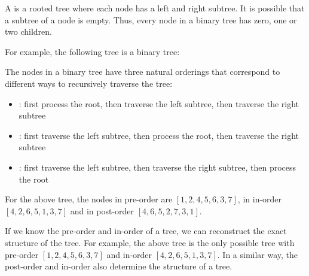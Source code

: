 
\begin{samepage}
A  is a rooted tree
where each node has a left and right subtree.
It is possible that a subtree of a node is empty.
Thus, every node in a binary tree has
zero, one or two children.

For example, the following tree is a binary tree:
\begin{center}
\end{center}
\end{samepage}


The nodes in a binary tree have three natural
orderings that correspond to different ways to 
recursively traverse the tree:

\begin{itemize}
\item {}: first process the root,
then traverse the left subtree, then traverse the right subtree
\item {}: first traverse the left subtree,
then process the root, then traverse the right subtree
\item {}: first traverse the left subtree,
then traverse the right subtree, then process the root
\end{itemize}

For the above tree, the nodes in
pre-order are
$[1,2,4,5,6,3,7]$,
in in-order $[4,2,6,5,1,3,7]$
and in post-order $[4,6,5,2,7,3,1]$.

If we know the pre-order and in-order
of a tree, we can reconstruct the exact structure of the tree.
For example, the above tree is the only possible tree
with pre-order $[1,2,4,5,6,3,7]$ and
in-order $[4,2,6,5,1,3,7]$.
In a similar way, the post-order and in-order
also determine the structure of a tree.

